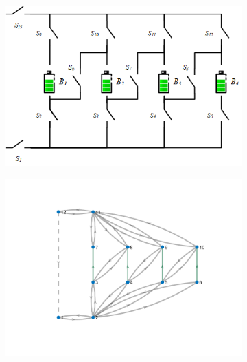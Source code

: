 \documentclass{article}
\begin{document}
\begin{figure}[htbp]
  \centering
  \begin{subfigure}[b]{0.45\textwidth}
    \includegraphics[width=\textwidth]{../attachments/f4-phy.png}
    \caption{}
    \label{fig:f4-phy}
  \end{subfigure}
  \hspace{0.05\textwidth}
  \begin{subfigure}[b]{0.45\textwidth}
    \includegraphics[width=\textwidth]{../attachments/f4-gra.png}
    \caption{}
    \label{fig:f4-gra}
  \end{subfigure}
  \\
  \begin{subfigure}[b]{0.45\textwidth}

\end{subfigure}
\end{figure}
\end{document}
